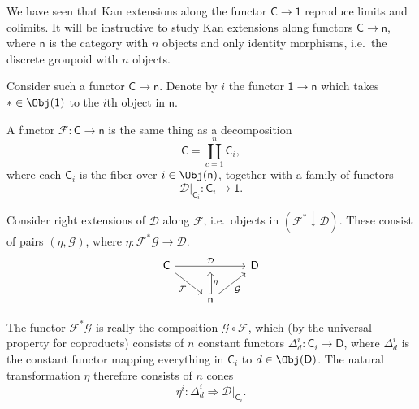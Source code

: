 \documentclass[notes.tex]{subfiles}
\begin{document}
\begin{example}
  \label{eg:kan_extension_along_functor_to_discrete_groupoid}
  We have seen that Kan extensions along the functor $\mathsf{C} \to \mathsf{1}$ reproduce limits and colimits. It will be instructive to study Kan extensions along functors $\mathsf{C} \to \mathsf{n}$, where $\mathsf{n}$ is the category with $n$ objects and only identity morphisms, i.e.\ the discrete groupoid with $n$ objects.

  Consider such a functor $\mathsf{C} \to \mathsf{n}$. Denote by $i$ the functor $\mathsf{1} \to \mathsf{n}$ which takes $* \in \Obj(\mathsf{1})$ to the $i$th object in $\mathsf{n}$.

  A functor $\mathcal{F}\colon \mathsf{C} \to \mathsf{n}$ is the same thing as a decomposition
  \begin{equation*}
    \mathsf{C} = \coprod_{c = 1}^{n} \mathsf{C}_{i},
  \end{equation*}
  where each $\mathsf{C}_{i}$ is the fiber over $i \in \Obj(\mathsf{n})$,
  together with a family of functors
  \begin{equation*}
    \mathcal{D}|_{\mathsf{C}_{i}}\colon \mathsf{C}_{i} \to \mathsf{1}.
  \end{equation*}

  Consider right extensions of $\mathcal{D}$ along $\mathcal{F}$, i.e.\ objects in $(\mathcal{F}^{*} \downarrow \mathcal{D})$. These consist of pairs $(\eta, \mathcal{G})$, where $\eta\colon \mathcal{F}^{*}\mathcal{G} \to \mathcal{D}$.
  \begin{equation*}
    \begin{tikzcd}
      \mathsf{C}
      \arrow[dr, swap, "\mathcal{F}"]
      \arrow[rr, ""'{name=U}, "\mathcal{D}"]
      && \mathsf{D}
      \\
      & \mathsf{n}
      \arrow[ur, swap, "\mathcal{G}"]
      \arrow[to=U, Rightarrow, swap, "\eta"]
    \end{tikzcd}
  \end{equation*}

  The functor $\mathcal{F}^{*}\mathcal{G}$ is really the composition $\mathcal{G} \circ \mathcal{F}$, which (by the universal property for coproducts) consists of $n$ constant functors $\Delta^{i}_{d}\colon \mathsf{C}_{i} \to \mathsf{D}$, where $\Delta^{i}_{d}$ is the constant functor mapping everything in $\mathsf{C}_{i}$ to $d \in \Obj(\mathsf{D})$. The natural transformation $\eta$ therefore consists of $n$ cones
  \begin{equation*}
    \eta^{i}\colon \Delta^{i}_{d} \Rightarrow \mathcal{D}|_{\mathsf{C}_{i}}.
  \end{equation*}


\end{example}
\end{document}
